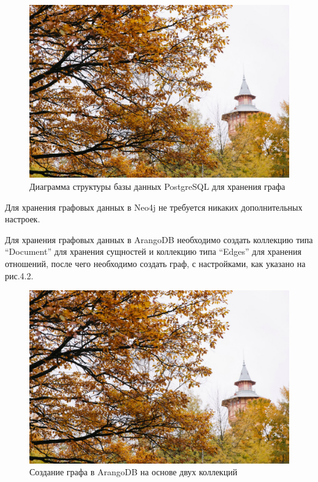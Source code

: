 \begin{figure}[ht!]
    \center
    \includegraphics [scale=0.27] {my_folder/images//spbpu_hydrotower}
    \caption{Диаграмма структуры базы данных PostgreSQL для хранения графа}
\end{figure}

Для хранения графовых данных в Neo4j не требуется никаких дополнительных настроек.

Для хранения графовых данных в ArangoDB необходимо создать коллекцию типа “Document” для хранения сущностей и коллекцию типа “Edges” для хранения отношений, после чего необходимо создать граф, с настройками, как указано на рис.4.2.

\begin{figure}[ht!]
    \center
    \includegraphics [scale=0.27] {my_folder/images//spbpu_hydrotower}
    \caption{Создание графа в ArangoDB на основе двух коллекций}
\end{figure}

